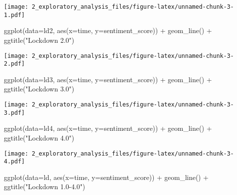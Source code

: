 \documentclass[
]{article}
\newenvironment{Shaded}{\begin{snugshade}}{\end{snugshade}}
\newcommand{\AttributeTok}[1]{\textcolor[rgb]{0.77,0.63,0.00}{#1}}
\newcommand{\FunctionTok}[1]{\textcolor[rgb]{0.00,0.00,0.00}{#1}}
\newcommand{\NormalTok}[1]{#1}
\newcommand{\SpecialCharTok}[1]{\textcolor[rgb]{0.00,0.00,0.00}{#1}}
\newcommand{\StringTok}[1]{\textcolor[rgb]{0.31,0.60,0.02}{#1}}
\begin{document}
\texttt{[image: 2\_exploratory\_analysis\_files/figure-latex/unnamed-chunk-3-1.pdf]}

\begin{Shaded}
\begin{Highlighting}[]
\FunctionTok{ggplot}\NormalTok{(}\AttributeTok{data=}\NormalTok{ld2, }\FunctionTok{aes}\NormalTok{(}\AttributeTok{x=}\NormalTok{time, }\AttributeTok{y=}\NormalTok{sentiment\_score)) }\SpecialCharTok{+} \FunctionTok{geom\_line}\NormalTok{() }\SpecialCharTok{+} \FunctionTok{ggtitle}\NormalTok{(}\StringTok{"Lockdown 2.0"}\NormalTok{)}
\end{Highlighting}
\end{Shaded}

\texttt{[image: 2\_exploratory\_analysis\_files/figure-latex/unnamed-chunk-3-2.pdf]}

\begin{Shaded}
\begin{Highlighting}[]
\FunctionTok{ggplot}\NormalTok{(}\AttributeTok{data=}\NormalTok{ld3, }\FunctionTok{aes}\NormalTok{(}\AttributeTok{x=}\NormalTok{time, }\AttributeTok{y=}\NormalTok{sentiment\_score)) }\SpecialCharTok{+} \FunctionTok{geom\_line}\NormalTok{() }\SpecialCharTok{+} \FunctionTok{ggtitle}\NormalTok{(}\StringTok{"Lockdown 3.0"}\NormalTok{)}
\end{Highlighting}
\end{Shaded}

\texttt{[image: 2\_exploratory\_analysis\_files/figure-latex/unnamed-chunk-3-3.pdf]}

\begin{Shaded}
\begin{Highlighting}[]
\FunctionTok{ggplot}\NormalTok{(}\AttributeTok{data=}\NormalTok{ld4, }\FunctionTok{aes}\NormalTok{(}\AttributeTok{x=}\NormalTok{time, }\AttributeTok{y=}\NormalTok{sentiment\_score)) }\SpecialCharTok{+} \FunctionTok{geom\_line}\NormalTok{() }\SpecialCharTok{+} \FunctionTok{ggtitle}\NormalTok{(}\StringTok{"Lockdown 4.0"}\NormalTok{)}
\end{Highlighting}
\end{Shaded}

\texttt{[image: 2\_exploratory\_analysis\_files/figure-latex/unnamed-chunk-3-4.pdf]}

\begin{Shaded}
\begin{Highlighting}[]
\FunctionTok{ggplot}\NormalTok{(}\AttributeTok{data=}\NormalTok{ld, }\FunctionTok{aes}\NormalTok{(}\AttributeTok{x=}\NormalTok{time, }\AttributeTok{y=}\NormalTok{sentiment\_score)) }\SpecialCharTok{+} \FunctionTok{geom\_line}\NormalTok{() }\SpecialCharTok{+} \FunctionTok{ggtitle}\NormalTok{(}\StringTok{"Lockdown 1.0{-}4.0"}\NormalTok{)}
\end{Highlighting}
\end{Shaded}
\end{document}
